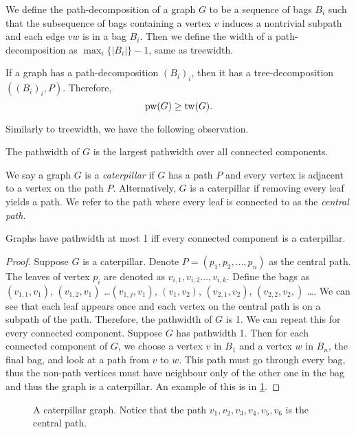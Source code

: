 We define the path-decomposition of a graph \(G\) to be a sequence of bags \(B_i\) such that the subsequence of bags containing a vertex \(v\) induces a nontrivial subpath and each edge \(vw\) is in a bag \(B_i\). Then we define the width of a path-decomposition as \(\max_i \lbrace |B_i| \rbrace -1\), same as treewidth.

If a graph has a path-decomposition \((B_i)_i\), then it has a tree-decomposition \(\left((B_i)_i, P\right)\). Therefore,
\begin{equation}
	\operatorname{pw}(G) \geq \operatorname{tw}(G).
\end{equation}

Similarly to treewidth, we have the following observation.
\begin{lemma}
	The pathwidth of \(G\) is the largest pathwidth over all connected components.
\end{lemma}
We say a graph \(G\) is a \textit{caterpillar} if \(G\) has a path \(P\) and every vertex is adjacent to a vertex on the path \(P\). Alternatively, \(G\) is a caterpillar if removing every leaf yields a path. We refer to the path where every leaf is connected to as the \textit{central path}.
\begin{theorem}[Caterpillars]
	Graphs have pathwidth at most 1 iff every connected component is a caterpillar.
\end{theorem}
\begin{proof}
	Suppose \(G\) is a caterpillar. 
	Denote \(P =\left( p_1, p_2, \dots, p_n\right)\) as the central path. The leaves of vertex \(p_i\) are denoted as \(v_{i, 1}, v_{i, 2} \dots, v_{i, k}\). Define the bags as \((v_{1, 1}, v_1)\), \((v_{1, 2}, v_1)\) \dots \((v_{1, j}, v_1)\),  \((v_1, v_2)\), \((v_{2, 1}, v_2)\), \((v_{2,2}, v_2,)\) \dots. We can see that each leaf appears once and each vertex on the central path is on a subpath of the path. Therefore, the pathwidth of \(G\) is 1. We can repeat this for every connected component.
	Suppose \(G\) has pathwidth 1. Then for each connected component of \(G\), we choose a vertex \(v\) in \(B_1\) and a vertex \(w\) in \(B_n\), the final bag, and look at a path from \(v\) to \(w\). This path must go through every bag, thus the non-path vertices must have neighbour only of the other one in the bag and thus the graph is a caterpillar. An example of this is in \cref{fig:caterpillar}.
\end{proof}
	\begin{figure}[ht]
		\centering
		
		\caption{A caterpillar graph. Notice that the path \(v_1, v_2, v_3, v_4, v_5, v_6\) is the central path.}
		\label{fig:caterpillar}
	\end{figure}

